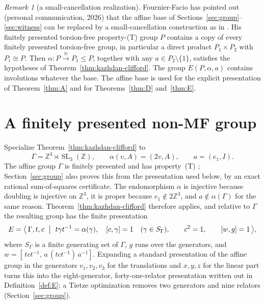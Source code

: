 \documentclass[11pt]{amsart}
\theoremstyle{definition}
\theoremstyle{remark}
\newtheorem{remark}[theorem]{Remark}
\theoremstyle{plain}
\newcommand{\SL}{\operatorname{SL}}
\begin{document}
\begin{remark}[a small-cancellation realization]
\label{rem:ff-realization}
Fournier-Facio has pointed out (personal communication, 2026) that the
affine base of Sections~\ref{sec:group}--\ref{sec:witness} can be
replaced by a small-cancellation construction as in \cite{FFF}.  His
finitely presented torsion-free property-\textup{(T)} group $P$
contains a copy of every finitely presented torsion-free group, in
particular a direct product $P_1\times P_2$ with $P_i\cong P$.  Then
$\alpha\colon P\xrightarrow{\;\cong\;}P_1\le P$, together with any
$a\in P_2\setminus\{1\}$, satisfies the hypotheses of
Theorem~\ref{thm:kazhdan-clifford}.  The group $E(P,\alpha,a)$
contains involutions whatever the base.  The affine base is used for
the explicit presentation of Theorem~\ref{thm:A} and for
Theorems~\ref{thm:D} and~\ref{thm:E}.
\end{remark}

\section{A finitely presented non-MF group}\label{sec:example}

Specialize Theorem~\ref{thm:kazhdan-clifford} to
\begin{equation}\label{eq:affine-data}
 \Gamma=\mathbb Z^3\rtimes\SL_3(\mathbb Z),\qquad
 \alpha(v,A)=(2v,A),\qquad a=(e_1,I).
\end{equation}
The affine group $\Gamma$ is finitely presented and has
property~\textup{(T)} \cite[Example~1.7.4(i)]{BHV};
Section~\ref{sec:group} also proves this from the presentation used
below, by an exact rational sum-of-squares certificate.  The
endomorphism $\alpha$ is injective because
doubling is injective on $\mathbb Z^3$, it is proper because
$e_1\notin2\mathbb Z^3$, and $a\notin\alpha(\Gamma)$ for the same
reason.  Theorem~\ref{thm:kazhdan-clifford} therefore applies, and
relative to $\Gamma$ the resulting group has the finite presentation
\[
 E=\bigl\langle\,\Gamma,t,c \ \bigm| \
   t\gamma t^{-1}=\alpha(\gamma),\quad
   [c,\gamma]=1 \quad(\gamma\in S_\Gamma),\qquad
   c^2=1,\qquad [w,g]=1 \,\bigr\rangle,
\]
where $S_\Gamma$ is a finite generating set of $\Gamma$, $g$ runs over
the generators, and $w=[\,tct^{-1},\,a\,(tct^{-1})\,a^{-1}]$.
Expanding a standard presentation of the affine group in the
generators $v_1,v_2,v_3$ for the translations and $x,y,z$ for the
linear part turns this into the eight-generator, forty-one-relator
presentation written out in Definition~\ref{def:E}; a Tietze
optimization removes two generators and nine relators
(Section~\ref{sec:group}).
\end{document}
